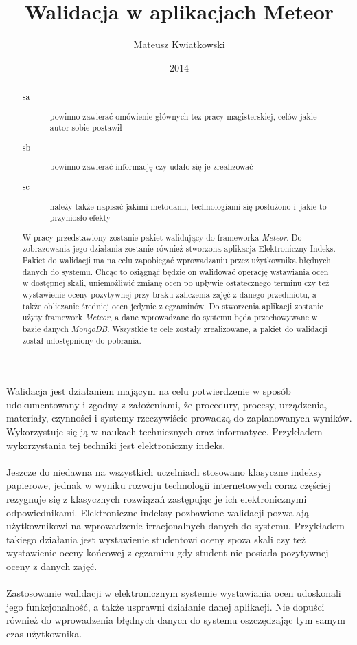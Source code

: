 \documentclass[brudnopis]{xmgr}
\author   {Mateusz Kwiatkowski}
\title    {Walidacja w aplikacjach Meteor}
\date     {2014}
\begin{document}
\begin{abstract}

\begin{description}
\item[sa] \textcolor{sa}{powinno zawierać omówienie głównych 
tez pracy magisterskiej, celów jakie autor sobie postawił}
\item[sb] \textcolor{sb}{powinno zawierać informację czy udało 
  się je zrealizować}
\item[sc] \textcolor{sc}{należy także napisać jakimi metodami,
  technologiami się posłużono i~jakie to przyniosło efekty}
\end{description}

\textcolor{sa}{W pracy przedstawiony zostanie pakiet walidujący do frameworka \textit{Meteor}. Do zobrazowania
jego działania zostanie również stworzona aplikacja Elektroniczny Indeks. Pakiet do walidacji ma na celu zapobiegać
wprowadzaniu przez użytkownika błędnych danych do systemu. Chcąc to osiągnąć będzie
on walidować operację wstawiania ocen w dostępnej skali, uniemożliwić zmianę ocen po
upływie ostatecznego terminu czy też wystawienie oceny pozytywnej przy braku zaliczenia zajęć
z danego przedmiotu, a także obliczanie średniej ocen jedynie z egzaminów.} \textcolor{sc}{Do stworzenia aplikacji zostanie użyty
framework \textit{Meteor}, a dane wprowadzane do systemu będa przechowywane w bazie danych \textit{MongoDB}.}
\textcolor{sb}{Wszystkie te cele zostały zrealizowane, a pakiet do walidacji został udostępniony do pobrania.}

\end{abstract}

\maketitle
%
\introduction

Walidacja jest działaniem mającym na celu potwierdzenie w sposób udokumentowany i zgodny
z założeniami, że procedury, procesy, urządzenia, materiały, czynności i systemy rzeczywiście
prowadzą do zaplanowanych wyników. Wykorzystuje się ją w naukach technicznych oraz informatyce.
Przykładem wykorzystania tej techniki jest elektroniczny indeks.
\\
\\
Jeszcze do niedawna na wszystkich uczelniach stosowano klasyczne indeksy papierowe,
jednak w wyniku rozwoju technologii internetowych coraz częściej rezygnuje się z klasycznych
rozwiązań zastępując je ich elektronicznymi odpowiednikami. Elektroniczne indeksy pozbawione
walidacji pozwalają użytkownikowi na wprowadzenie irracjonalnych danych do systemu.
Przykładem takiego działania jest wystawienie studentowi oceny spoza skali czy też wystawienie
oceny końcowej z egzaminu gdy student nie posiada pozytywnej oceny z danych zajęć.
\\
\\
Zastosowanie walidacji w elektronicznym systemie wystawiania ocen udoskonali jego funkcjonalność,
a także usprawni działanie danej aplikacji. Nie dopuści również do wprowadzenia błędnych danych do systemu
oszczędzając tym samym czas użytkownika.
\end{document}
